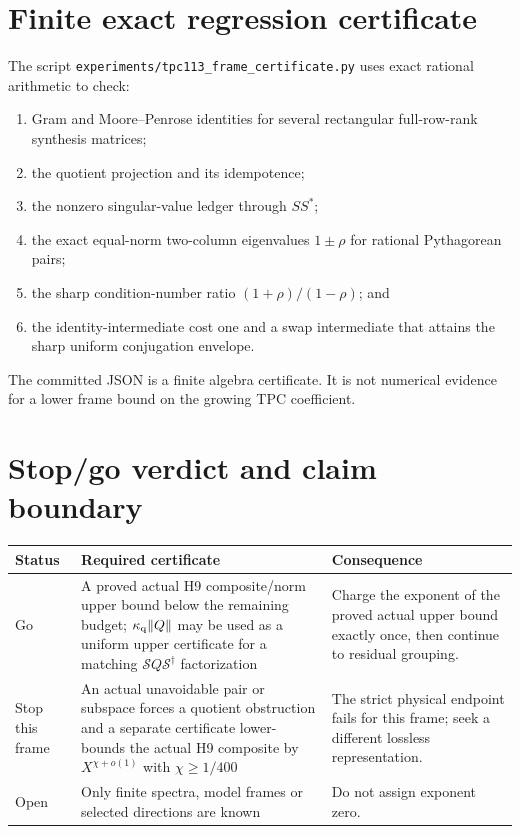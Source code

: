 \documentclass[11pt]{article}
\theoremstyle{definition}
\theoremstyle{remark}
\newcommand{\Syn}{\mathcal S}
\begin{document}
\section{Finite exact regression certificate}

The script
\texttt{experiments/tpc113\_frame\_certificate.py} uses exact rational
arithmetic to check:
\begin{enumerate}[leftmargin=2em]
\item Gram and Moore--Penrose identities for several rectangular
  full-row-rank synthesis matrices;
\item the quotient projection and its idempotence;
\item the nonzero singular-value ledger through \(SS^*\);
\item the exact equal-norm two-column eigenvalues \(1\pm\rho\) for
  rational Pythagorean pairs;
\item the sharp condition-number ratio
  \((1+\rho)/(1-\rho)\); and
\item the identity-intermediate cost one and a swap intermediate that
  attains the sharp uniform conjugation envelope.
\end{enumerate}
The committed JSON is a finite algebra certificate.  It is not
numerical evidence for a lower frame bound on the growing TPC
coefficient.

\section{Stop/go verdict and claim boundary}

\begin{center}
\small
\begin{tabularx}{\textwidth}{@{}p{}p{}X@{}}
\toprule
Status & Required certificate & Consequence\\
\midrule
Go &
A proved actual H9 composite/norm upper bound below the remaining
budget; \(\kappa_{\rm q}\|Q\|\) may be used as a uniform upper
certificate for a matching \(\Syn Q\Syn^\dagger\) factorization &
Charge the exponent of the proved actual upper bound exactly once,
then continue to residual grouping.\\
Stop this frame &
An actual unavoidable pair or subspace forces a quotient obstruction
and a separate certificate lower-bounds the actual H9 composite by
\(X^{\chi+o(1)}\) with \(\chi\ge1/400\) &
The strict physical endpoint fails for this frame; seek a different
lossless representation.\\
Open &
Only finite spectra, model frames or selected directions are known &
Do not assign exponent zero.\\
\bottomrule
\end{tabularx}
\end{center}
\end{document}
